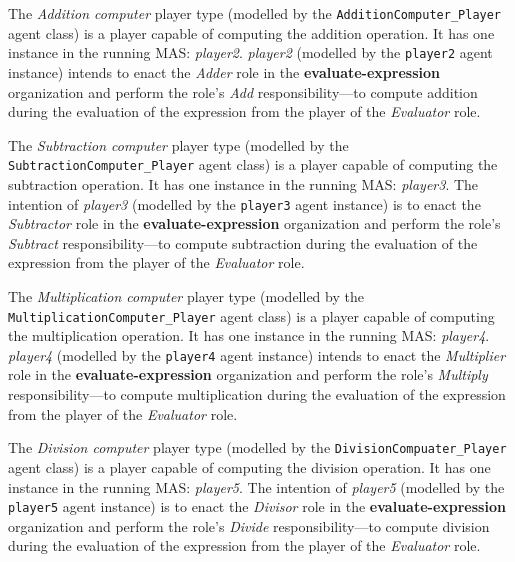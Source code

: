 The \textit{Addition computer} player type (modelled by the \texttt{AdditionComputer\_Player} agent class) is a player capable of computing the addition operation.
It has one instance in the running MAS: \textit{player2}.
\textit{player2} (modelled by the \texttt{player2} agent instance) intends to enact the \textit{Adder} role in the \textbf{evaluate-expression} organization and perform the role's \textit{Add} responsibility---to compute addition during the evaluation of the expression from the player of the \textit{Evaluator} role.

The \textit{Subtraction computer} player type (modelled by the \texttt{SubtractionComputer\_Player} agent class) is a player capable of computing the subtraction operation.
It has one instance in the running MAS: \textit{player3}.
The intention of \textit{player3} (modelled by the \texttt{player3} agent instance) is to enact the \textit{Subtractor} role in the \textbf{evaluate-expression} organization and perform the role's \textit{Subtract} responsibility---to compute subtraction during the evaluation of the expression from the player of the  \textit{Evaluator} role.

The \textit{Multiplication computer} player type (modelled by the \texttt{MultiplicationComputer\_Player} agent class) is a player capable of computing the multiplication operation.
It has one instance in the running MAS: \textit{player4}.
\textit{player4} (modelled by the \texttt{player4} agent instance) intends to enact the \textit{Multiplier} role in the \textbf{evaluate-expression} organization and perform the role's \textit{Multiply} responsibility---to compute multiplication during the evaluation of the expression from the player of the \textit{Evaluator} role.

The \textit{Division computer} player type (modelled by the \texttt{DivisionCompuater\_Player} agent class) is a player capable of computing the division operation.
It has one instance in the running MAS: \textit{player5}.
The intention of \textit{player5} (modelled by the \texttt{player5} agent instance) is to enact the \textit{Divisor} role in the \textbf{evaluate-expression} organization and perform the role's \textit{Divide} responsibility---to compute division during the evaluation of the expression from the player of the \textit{Evaluator} role.

